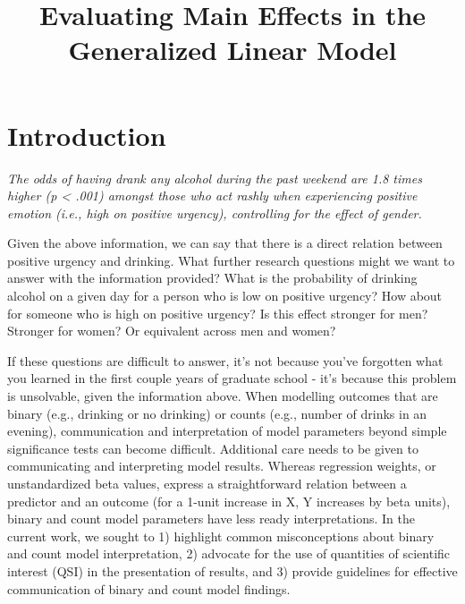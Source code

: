 \documentclass[jou, apacite]{apa6}
\begin{document}
\title{Evaluating Main Effects in the Generalized Linear Model}


\abstract{}



\maketitle

\section{Introduction}
\textit{The odds of having drank any alcohol during the past weekend are 1.8 times higher (p < .001) amongst those who act rashly when experiencing positive emotion (i.e., high on positive urgency), controlling for the effect of gender.}

Given the above information, we can say that there is a direct relation between positive urgency and drinking. What further research questions might we want to answer with the information provided? What is the probability of drinking alcohol on a given day for a person who is low on positive urgency? How about for someone who is high on positive urgency? Is this effect stronger for men? Stronger for women? Or equivalent across men and women?

If these questions are difficult to answer, it's not because you've forgotten what you learned in the first couple years of graduate school - it's because this problem is unsolvable, given the information above. 
When modelling outcomes that are binary (e.g., drinking or no drinking) or counts (e.g., number of drinks in an evening), communication and interpretation of model parameters beyond simple significance tests can become difficult. 
Additional care needs to be given to communicating and interpreting model results. Whereas regression weights, or unstandardized beta values, express a straightforward relation between a predictor and an outcome (for a 1-unit increase in X, Y increases by beta units), binary and count model parameters have less ready interpretations. 
In the current work, we sought to 1) highlight common misconceptions about binary and count model interpretation, 2) advocate for the use of quantities of scientific interest (QSI) in the presentation of results, and 3) provide guidelines for effective communication of binary and count model findings.
\end{document}
